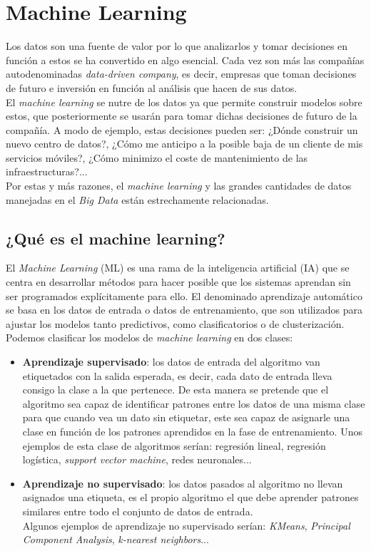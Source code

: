 \chapter{Machine Learning}
Los datos son una fuente de valor por lo que analizarlos y tomar decisiones en función a estos se ha
convertido en algo esencial. Cada vez son más las compañías autodenominadas 
\textit{data-driven company}, es decir, empresas que toman decisiones de 
futuro e inversión en función al análisis que hacen de sus datos.\\
El \textit{machine learning} se nutre de los datos ya que permite construir modelos sobre estos,
que posteriormente se usarán para tomar dichas decisiones de futuro de la compañía. A modo de ejemplo, estas
decisiones pueden ser: ¿Dónde construir un nuevo centro de datos?, ¿Cómo me anticipo a la posible baja de un
cliente de mis servicios móviles?, ¿Cómo minimizo el coste de mantenimiento de las infraestructuras?...\\
Por estas y más razones, el \textit{machine learning} y las grandes cantidades de datos manejadas en el 
\textit{Big Data} están estrechamente relacionadas.

\section{¿Qué es el machine learning?}
El \textit{Machine Learning} (ML) es una rama de la inteligencia artificial (IA) 
que se centra en desarrollar métodos para hacer posible que los sistemas aprendan sin ser programados 
explícitamente para ello.
El denominado aprendizaje automático se basa en los datos de entrada o datos de entrenamiento, que
son utilizados para ajustar los modelos tanto predictivos, como clasificatorios o de clusterización.\\
Podemos clasificar los modelos de \textit{machine learning} en dos clases:
\begin{itemize}
  \item \textbf{Aprendizaje supervisado}: los datos de entrada del 
  algoritmo van etiquetados con la salida esperada, es decir, cada dato de entrada lleva consigo 
  la clase a la que pertenece. De esta manera se pretende que el algoritmo sea capaz de identificar 
  patrones entre los datos de una misma clase para que cuando vea un dato sin etiquetar, este sea 
  capaz de asignarle una clase en función de los patrones aprendidos en la fase de entrenamiento.
  Unos ejemplos de esta clase de algoritmos serían: regresión lineal, regresión logística, 
  \textit{support vector machine}, redes neuronales...
  
  \item \textbf{Aprendizaje no supervisado}: los datos pasados 
  al algoritmo no llevan asignados una etiqueta, es el propio algoritmo el que debe aprender 
  patrones similares entre todo el conjunto de datos de entrada.\\
  Algunos ejemplos de aprendizaje no supervisado serían: \textit{KMeans}, \textit{Principal Component Analysis}, 
  \textit{k-nearest neighbors}...
\end{itemize}

